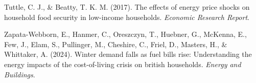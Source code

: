 \documentclass[
  twoside,
  openright,
  degree    = master,               %
  language  = english,              %
  fontset   = overleaf,             %
  watermark = true,                 %
  doi       = true,                 %
]{ntuthesis}
\newlength{\cslhangindent}
\newlength{\cslentryspacingunit} %
\newenvironment{CSLReferences}[2] %
 {%
  \setlength{\parindent}{0pt}
  \ifodd #1
  \let\oldpar\par
  \def\par{\hangindent=\cslhangindent\oldpar}
  \fi
  \setlength{\parskip}{#2\cslentryspacingunit}
 }%
 {}
\begin{document}
\begin{CSLReferences}{1}{0}
\leavevmode{}%
Tuttle, C. J., \& Beatty, T. K. M. (2017). The effects of energy price
shocks on household food security in low-income households.
\emph{Economic Research Report}.

\leavevmode{}%
Zapata-Webborn, E., Hanmer, C., Oreszczyn, T., Huebner, G., McKenna, E.,
Few, J., Elam, S., Pullinger, M., Cheshire, C., Friel, D., Masters, H.,
\& Whittaker, A. (2024). Winter demand falls as fuel bills rise:
Understanding the energy impacts of the cost-of-living crisis on british
households. \emph{Energy and Buildings}.

\end{CSLReferences}


\end{document}
